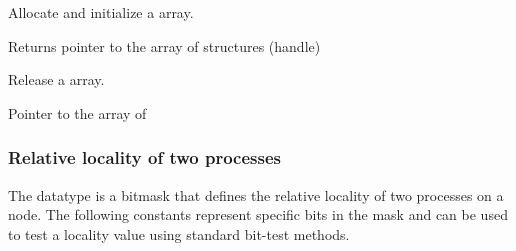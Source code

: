 
Allocate and initialize a  array.


\begin{arglist}
\end{arglist}

Returns pointer to the array of  structures (handle)



Release a  array.


\begin{arglist}
 Pointer to the array of 
\end{arglist}



\subsubsection{Relative locality of two processes}
\label{api:proc:locality}

The  datatype is a  bitmask that
defines the relative locality of two processes on a node. The following
constants represent specific bits in the mask and can be used to test a
locality value using standard bit-test methods.

